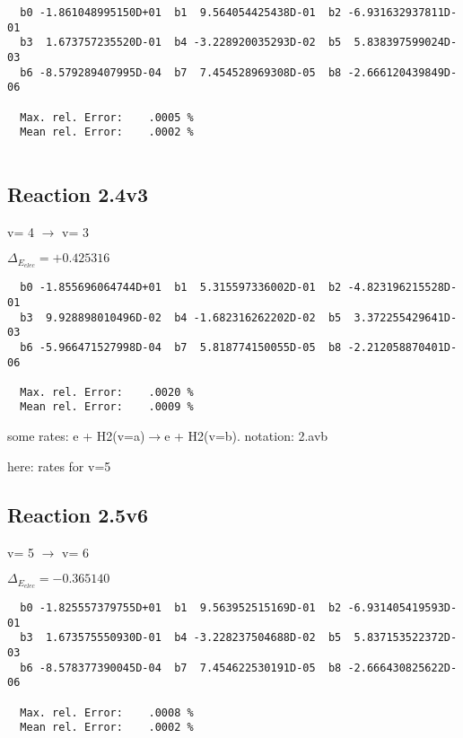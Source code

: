 \documentclass[12pt]{article}
\begin{document}
\begin{small}\begin{verbatim}
  b0 -1.861048995150D+01  b1  9.564054425438D-01  b2 -6.931632937811D-01
  b3  1.673757235520D-01  b4 -3.228920035293D-02  b5  5.838397599024D-03
  b6 -8.579289407995D-04  b7  7.454528969308D-05  b8 -2.666120439849D-06

  Max. rel. Error:    .0005 %
  Mean rel. Error:    .0002 %


\end{verbatim}\end{small}

\subsection{
Reaction 2.4v3
}

  v=  4 $\rightarrow$ v= 3

$\Delta_{E_{elec}}=+0.425316$


\begin{small}\begin{verbatim}
  b0 -1.855696064744D+01  b1  5.315597336002D-01  b2 -4.823196215528D-01
  b3  9.928898010496D-02  b4 -1.682316262202D-02  b5  3.372255429641D-03
  b6 -5.966471527998D-04  b7  5.818774150055D-05  b8 -2.212058870401D-06

  Max. rel. Error:    .0020 %
  Mean rel. Error:    .0009 %

\end{verbatim}\end{small}

\newpage
some rates: e + H2(v=a)$\rightarrow$e + H2(v=b). notation: 2.avb

here: rates for v=5


\subsection{
Reaction 2.5v6
}

  v=  5 $\rightarrow$ v= 6


$\Delta_{E_{elec}}=-0.365140$


\begin{small}\begin{verbatim}
  b0 -1.825557379755D+01  b1  9.563952515169D-01  b2 -6.931405419593D-01
  b3  1.673575550930D-01  b4 -3.228237504688D-02  b5  5.837153522372D-03
  b6 -8.578377390045D-04  b7  7.454622530191D-05  b8 -2.666430825622D-06

  Max. rel. Error:    .0008 %
  Mean rel. Error:    .0002 %


\end{verbatim}\end{small}
\end{document}
